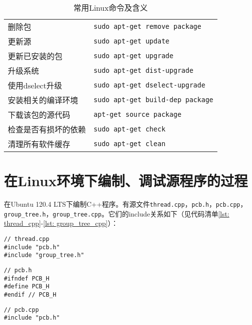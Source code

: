 \documentclass[11pt]{article}
\begin{document}
\begin{table}[htbp]
\begin{tabular}{ll}
删除包 & \texttt{sudo apt-get remove package} \\
更新源 & \texttt{sudo apt-get update} \\
更新已安装的包 & \texttt{sudo apt-get upgrade} \\
升级系统 & \texttt{sudo apt-get dist-upgrade} \\
使用dselect升级 & \texttt{sudo apt-get dselect-upgrade} \\
安装相关的编译环境 & \texttt{sudo apt-get build-dep package} \\
下载该包的源代码 & \texttt{apt-get source package} \\
检查是否有损坏的依赖 & \texttt{sudo apt-get check} \\
清理所有软件缓存 & \texttt{sudo apt-get clean} \\
\hline
\end{tabular}
\caption{常用Linux命令及含义\label{tab: linux}}
\end{table}

\section{在Linux环境下编制、调试源程序的过程}
在Ubuntu 120.4 LTS下编制C++程序。有源文件\texttt{thread.cpp}，\texttt{pcb.h}，\texttt{pcb.cpp}，\texttt{group\_tree.h}，\texttt{group\_tree.cpp}。它们的include关系如下（见代码清单\ref{lst: thread_cpp}-\ref{lst: group_tree_cpp}）：

\begin{center}
\begin{lstlisting}[caption = {\texttt{thread.cpp}的include关系}, label = {lst: thread_cpp}]
// thread.cpp
#include "pcb.h"
#include "group_tree.h"
\end{lstlisting}
\end{center}

\begin{center}
\begin{lstlisting}[caption = {\texttt{pcb.h}的include关系}, label = {lst: pcb_h}]
// pcb.h
#ifndef PCB_H
#define PCB_H
#endif // PCB_H
\end{lstlisting}
\end{center}

\begin{center}
\begin{lstlisting}[caption = {\texttt{pcb.cpp}的include关系}, label = {lst: pcb_cpp}]
// pcb.cpp
#include "pcb.h"
\end{lstlisting}
\end{center}
\end{document}

